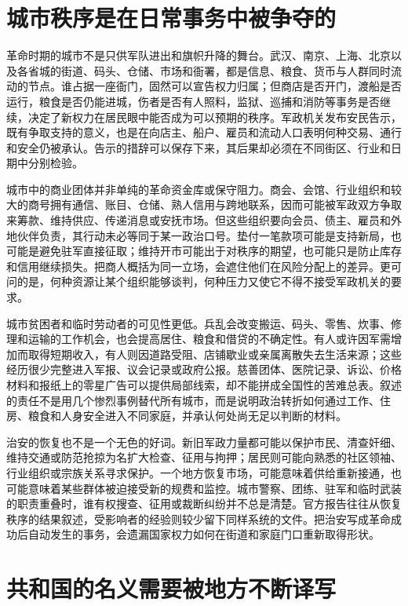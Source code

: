 \section{城市秩序是在日常事务中被争夺的}

革命时期的城市不是只供军队进出和旗帜升降的舞台。武汉、南京、上海、北京以及各省城的街道、码头、仓储、市场和衙署，都是信息、粮食、货币与人群同时流动的节点。谁占据一座衙门，固然可以宣告权力归属；但商店是否开门，渡船是否运行，粮食是否仍能进城，伤者是否有人照料，监狱、巡捕和消防等事务是否继续，决定了新权力在居民眼中能否成为可以预期的秩序。军政机关发布安民告示，既有争取支持的意义，也是在向店主、船户、雇员和流动人口表明何种交易、通行和安全仍被承认。告示的措辞可以保存下来，其后果却必须在不同街区、行业和日期中分别检验。

城市中的商业团体并非单纯的革命资金库或保守阻力。商会、会馆、行业组织和较大的商号拥有通信、账目、仓储、熟人信用与跨地联系，因而可能被军政双方争取来筹款、维持供应、传递消息或安抚市场。但这些组织要向会员、债主、雇员和外地伙伴负责，其行动未必等同于某一政治口号。垫付一笔款项可能是支持新局，也可能是避免驻军直接征取；维持开市可能出于对秩序的期望，也可能只是防止库存和信用继续损失。把商人概括为同一立场，会遮住他们在风险分配上的差异。更可问的是，何种资源让某个组织能够谈判，何种压力又使它不得不接受军政机关的要求。

城市贫困者和临时劳动者的可见性更低。兵乱会改变搬运、码头、零售、炊事、修理和运输的工作机会，也会提高居住、粮食和借贷的不确定性。有人或许因军需增加而取得短期收入，有人则因道路受阻、店铺歇业或亲属离散失去生活来源；这些经历很少完整进入军报、议会记录或政府公报。慈善团体、医院记录、诉讼、价格材料和报纸上的零星广告可以提供局部线索，却不能拼成全国性的苦难总表。叙述的责任不是用几个惨烈事例替代所有城市，而是说明政治转折如何通过工作、住房、粮食和人身安全进入不同家庭，并承认何处尚无足以判断的材料。

治安的恢复也不是一个无色的好词。新旧军政力量都可能以保护市民、清查奸细、维持交通或防范抢掠为名扩大检查、征用与拘押；居民则可能向熟悉的社区领袖、行业组织或宗族关系寻求保护。一个地方恢复市场，可能意味着供给重新接通，也可能意味着某些群体被迫接受新的规费和监控。城市警察、团练、驻军和临时武装的职责重叠时，谁有权搜查、征用或裁断纠纷并不总是清楚。官方报告往往从恢复秩序的结果叙述，受影响者的经验则较少留下同样系统的文件。把治安写成革命成功后自动发生的事务，会遗漏国家权力如何在街道和家庭门口重新取得形状。

\section{共和国的名义需要被地方不断译写}

